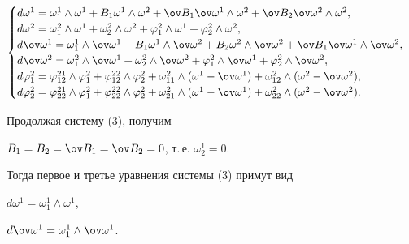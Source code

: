 \begin{equation} 


\begin{cases} 


d\omega^1=\omega^1_1\wedge\omega^1+B_1\omega^1\wedge\omega^2+ 


\ov B_1\ov\omega^1\wedge\omega^2+\ov B_2\ov\omega^2\wedge\omega^2,\\ 


d\omega^2=\omega^2_1\wedge\omega^1+\omega^2_2\wedge\omega^2+ 


\varphi^2_1\wedge\omega^1+\varphi^2_2\wedge\omega^2,\\ 


d\ov\omega^1=\omega^1_1\wedge\ov\omega^1+ 


B_1\omega^1\wedge\ov\omega^2+B_2\omega^2\wedge\ov\omega^2+ 


\ov B_1\ov\omega^1\wedge\ov\omega^2,\\ 


d\ov\omega^2=\omega^2_1\wedge\ov\omega^1+\omega^2_2\wedge 


\ov\omega^2+\varphi^2_1\wedge\ov\omega^1+ 


\varphi^2_2\wedge\ov\omega^2, \\ 


d\varphi^2_1=\varphi^{21}_{12}\wedge\varphi^2_1+ 


\varphi^{22}_{12}\wedge\varphi^2_2+\omega^2_{11}\wedge 


(\omega^1-\ov\omega^1)+\omega^2_{12}\wedge 


(\omega^2-\ov\omega^2), \\ 


d\varphi^2_2=\varphi^{21}_{22}\wedge\varphi^2_1+ 


\varphi^{22}_{22}\wedge\varphi^2_2+\omega^2_{21}\wedge 


(\omega^1-\ov\omega^1)+\omega^2_{22}\wedge 


(\omega^2-\ov\omega^2). 


\end{cases} 


\end{equation} 


Продолжая систему (3), получим 


$B_1=B_2=\ov B_1=\ov B_2=0$, т.\,е. $\omega^1_2=0$. 


Тогда первое и третье уравнения системы (3) примут вид 


$d\omega^1=\omega^1_1\wedge\omega^1$, 


$d\ov\omega^1=\omega^1_1\wedge\ov\omega^1$. 


